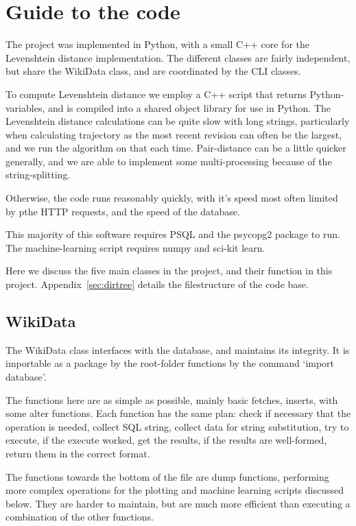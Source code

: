 \section{Guide to the code}

The project was implemented in Python, with a small C++ core for the
Levenshtein distance implementation. The different classes are fairly
independent, but share the WikiData class, and are coordinated by the
CLI classes. 

To compute Levenshtein distance we employ a C++ script that returns
Python-variables, and is compiled into a shared object library for use
in Python. The Levenshtein distance calculations can be quite slow
with long strings, particularly when calculating trajectory as the
most recent revision can often be the largest, and we run the
algorithm on that each time. Pair-distance can be a little quicker
generally, and we are able to implement some multi-processing because
of the string-splitting.

Otherwise, the code runs reasonably quickly, with it's speed most
often limited by pthe HTTP requests, and the speed of the
database.

This majority of this software requires PSQL and the psycopg2 package
to run. The machine-learning script requires numpy and sci-kit learn.

Here we discuss the five main classes in the project, and their
function in this project. Appendix~\ref{sec:dirtree} details the
filestructure of the code base.

\subsection*{WikiData}
The WikiData class interfaces with the database, and maintains its
integrity. It is importable as a package by the root-folder functions
by the command `import database'.

The functions here are as simple as possible, mainly basic fetches,
inserts, with some alter functions. Each function has the same plan:
check if necessary that the operation is needed, collect SQL string,
collect data for string substitution, try to execute, if the execute
worked, get the results, if the results are well-formed, return them in the
correct format.

The functions towards the bottom of the file are dump functions,
performing more complex operations for the plotting and machine
learning scripts discussed below. They are harder to maintain, but are
much more efficient than executing a combination of the other
functions.

